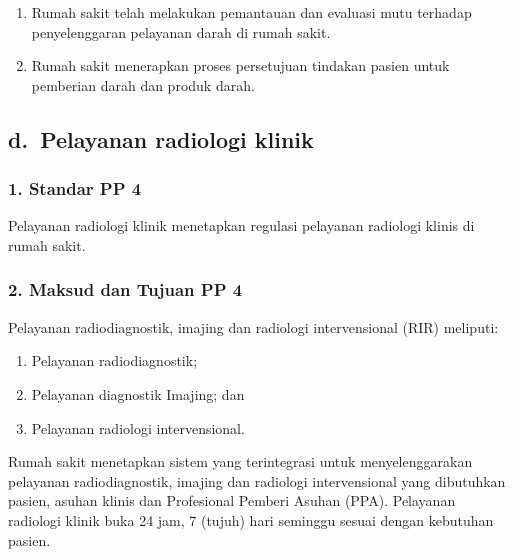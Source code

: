 \documentclass[
]{book}
\providecommand{\tightlist}{%
  \setlength{\itemsep}{0pt}\setlength{\parskip}{0pt}}
\begin{document}
\begin{enumerate}
\def\labelenumi{\alph{enumi})}
\setcounter{enumi}{2}
\tightlist
\item
  Rumah sakit telah melakukan pemantauan dan evaluasi mutu terhadap penyelenggaran pelayanan darah di rumah sakit.
\item
  Rumah sakit menerapkan proses persetujuan tindakan pasien untuk pemberian darah dan produk darah.
\end{enumerate}

\hypertarget{d.-pelayanan-radiologi-klinik}{%
\subsection*{d.~Pelayanan radiologi klinik}\label{d.-pelayanan-radiologi-klinik}}

\hypertarget{standar-pp-4}{%
\subsubsection*{1. Standar PP 4}\label{standar-pp-4}}

Pelayanan radiologi klinik menetapkan regulasi pelayanan radiologi klinis di rumah sakit.

\hypertarget{maksud-dan-tujuan-pp-4}{%
\subsubsection*{2. Maksud dan Tujuan PP 4}\label{maksud-dan-tujuan-pp-4}}

Pelayanan radiodiagnostik, imajing dan radiologi intervensional (RIR) meliputi:

\begin{enumerate}
\def\labelenumi{\alph{enumi}.}
\tightlist
\item
  Pelayanan radiodiagnostik;
\item
  Pelayanan diagnostik Imajing; dan
\item
  Pelayanan radiologi intervensional.
\end{enumerate}

Rumah sakit menetapkan sistem yang terintegrasi untuk menyelenggarakan pelayanan radiodiagnostik, imajing dan radiologi intervensional yang dibutuhkan pasien, asuhan klinis dan Profesional Pemberi Asuhan (PPA). Pelayanan radiologi klinik buka 24 jam, 7 (tujuh) hari seminggu sesuai dengan kebutuhan pasien.
\end{document}
